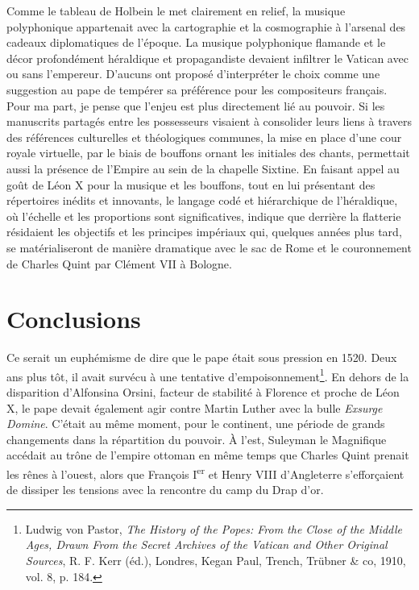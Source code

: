 \documentclass[12pt,twoside,openany]{book}
\begin{document}
Comme le tableau de Holbein le met clairement en relief, la musique polyphonique appartenait avec la cartographie et la cosmographie à l’arsenal des cadeaux diplomatiques de l’époque. La musique polyphonique flamande et le décor profondément héraldique et propagandiste devaient infiltrer le Vatican avec ou sans l’empereur. D’aucuns ont proposé d’interpréter le choix comme une suggestion au pape de tempérer sa préférence pour les compositeurs français. Pour ma part, je pense que l’enjeu est plus directement lié au pouvoir. Si les manuscrits partagés entre les possesseurs visaient à consolider leurs liens à travers des références culturelles et théologiques communes, la mise en place d’une cour royale virtuelle, par le biais de bouffons ornant les initiales des chants, permettait aussi la présence de l’Empire au sein de la chapelle Sixtine. En faisant appel au goût de Léon X pour la musique et les bouffons, tout en lui présentant des répertoires inédits et innovants, le langage codé et hiérarchique de l’héraldique, où l’échelle et les proportions sont significatives, indique que derrière la flatterie résidaient les objectifs et les principes impériaux qui, quelques années plus tard, se matérialiseront de manière dramatique avec le sac de Rome et le couronnement de Charles Quint par Clément VII à Bologne.

\section{Conclusions}

Ce serait un euphémisme de dire que le pape était sous pression en 1520. Deux ans plus tôt, il avait survécu à une tentative d’empoisonnement\footnote{Ludwig von Pastor, \textit{The History of the Popes: From the Close of the Middle Ages, Drawn From the Secret Archives of the Vatican and Other Original Sources}, R. F. Kerr (éd.), Londres, Kegan Paul, Trench, Trübner \& co, 1910, vol. 8, p. 184.}. En dehors de la disparition d’Alfonsina Orsini, facteur de stabilité à Florence et proche de Léon X, le pape devait également agir contre Martin Luther avec la bulle \textit{Exsurge Domine}. C’était au même moment, pour le continent, une période de grands changements dans la répartition du pouvoir. À l’est, Suleyman le Magnifique accédait au trône de l’empire ottoman en même temps que Charles Quint prenait les rênes à l’ouest, alors que François I\textsuperscript{er} et Henry VIII d’Angleterre s’efforçaient de dissiper les tensions avec la rencontre du camp du Drap d’or.
\end{document}
